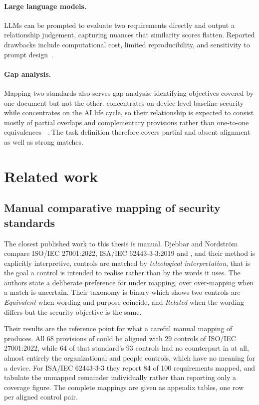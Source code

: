 \paragraph{Large language models.}
LLMs can be prompted to evaluate two requirements directly and output a
relationship judgement, capturing nuances that similarity scores flatten.
Reported drawbacks include computational cost, limited reproducibility, and
sensitivity to prompt design~\cite{jamshidi2025llmiot,rodriguez2024llm}.

\paragraph{Gap analysis.}
Mapping two standards also serves gap analysis: identifying objectives covered
by one document but not the other. \standardA{} concentrates on device-level
baseline security while \standardB{} concentrates on the AI life cycle, so
their relationship is expected to consist mostly of partial overlaps and
complementary provisions rather than one-to-one equivalences
~\cite{etsi303645,etsi304223}. The task definition therefore covers partial and
absent alignment as well as strong matches.

\section{Related work}

\subsection{Manual comparative mapping of security standards}\label{sec:manualmapping}

The closest published work to this thesis is manual. Djebbar and
Nordstr\"{o}m~\cite{djebbar2023comparative} compare ISO/IEC 27001:2022,
ISA/IEC 62443-3-3:2019 and \standardA{}, and their method is explicitly
interpretive, controls are matched by \emph{teleological interpretation}, that
is the goal a control is intended to realise rather than by the words it
uses. The authors state a deliberate preference for under mapping, over
over-mapping when a match is uncertain. Their taxonomy is binary which shows two
controls are \emph{Equivalent} when wording and purpose coincide, and
\emph{Related} when the wording differs but the security objective is the same.

Their results are the reference point for what a careful manual mapping of
\standardA{} produces. All 68 provisions of \standardA{} could be aligned with
29 controls of ISO/IEC 27001:2022, while 64 of that standard's 93 controls had
no counterpart in \standardA{} at all, almost entirely the organizational
and people controls, which have no meaning for a device. For ISA/IEC 62443-3-3
they report 84 of 100 requirements mapped, and tabulate the unmapped remainder
individually rather than reporting only a coverage figure. The complete
mappings are given as appendix tables, one row per aligned control pair.

